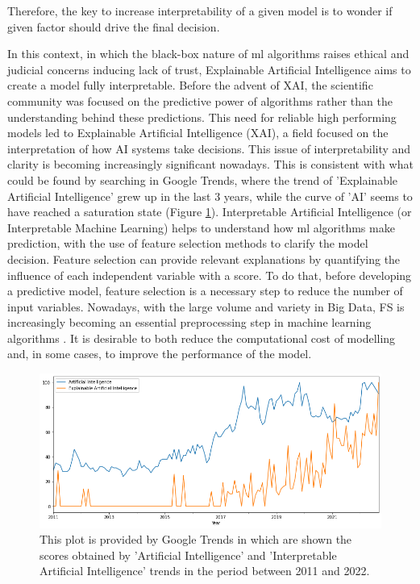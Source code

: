 Therefore, the key to increase interpretability of a given model is to wonder if given factor should drive the final decision.\par
In this context, in which the black-box nature of \acrshort{ml} algorithms raises ethical and judicial concerns inducing lack of trust\cite{9141213}, Explainable Artificial Intelligence aims to create a model fully interpretable.
Before the advent of XAI, the scientific community was focused on the predictive power of algorithms rather than the understanding behind these predictions.
This need for reliable high performing models led to Explainable Artificial Intelligence (XAI), a field focused on the interpretation of how AI systems take decisions.
This issue of interpretability and clarity is becoming increasingly significant nowadays. 
This is consistent with what could be found by searching in Google Trends, where the trend of 'Explainable Artificial Intelligence' grew up in the last 3 years, while the curve of 'AI' seems to have reached a saturation state (Figure \ref{fig:AI_XAI}).
Interpretable Artificial Intelligence (or Interpretable Machine Learning) helps to understand how \acrshort{ml} algorithms make prediction, with the use of feature selection methods to clarify the model decision.
Feature selection can provide relevant explanations by quantifying the influence of each independent variable with a score.
To do that, before developing a predictive model, feature selection is a necessary step to reduce the number of input variables. \newline
Nowadays, with the large volume and variety in Big Data, FS is increasingly becoming an essential preprocessing step in machine learning algorithms \cite{kamolov2021feature}.
It is desirable to both reduce the computational cost of modelling and, in some cases, to improve the performance of the model.\newline
\begin{figure}[H]
    \includegraphics[scale=0.50]{images/AI_XAI.png}
    \caption{This plot is provided by Google Trends in which are shown the scores obtained by 'Artificial Intelligence' and 'Interpretable Artificial Intelligence' trends in the period between 2011 and 2022.}
    \label{fig:AI_XAI}
\end{figure}
